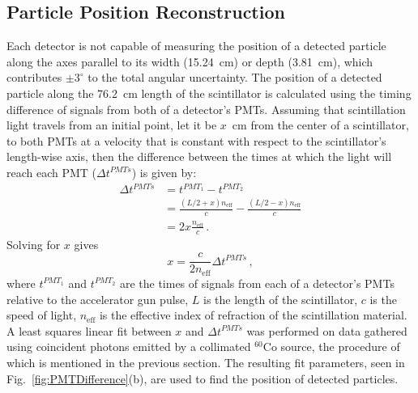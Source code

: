 \subsection{Particle Position Reconstruction}
Each detector is not capable of measuring the position of a detected particle along the axes parallel to its width (15.24~cm) or depth (3.81~cm), which contributes $\pm3^{\circ}$ to the total angular uncertainty.
The position of a detected particle along the 76.2~cm length of the scintillator is calculated using the timing difference of signals from both of a detector's PMTs.
Assuming that scintillation light travels from an initial point, let it be $x$~cm from the center of a scintillator, to both PMTs at a velocity that is constant with respect to the scintillator's length-wise axis, then the difference between the times at which the light will reach each PMT ($\Delta t^{PMTs}$) is given by:
\begin{equation}
\begin{split}
\Delta t^{PMTs} & = t^{PMT_1}-t^{PMT_2} \\ 
& = \frac{(L/2 + x) n_{\text{eff}}}{c} - \frac{(L/2-x) n_{\text{eff}}}{c} \\
& = 2x \frac{n_{\text{eff}}}{c}  \, .
\end{split}
\end{equation}
Solving for $x$ gives 
\begin{equation}
\label{eq:position}
x = \frac{c}{2n_{\text{eff}}} \Delta t^{PMTs} \, ,
\end{equation}
where $t^{PMT_{1}}$ and $t^{PMT_{2}}$ are the times of signals from each of a detector's PMTs relative to the accelerator gun pulse, $L$ is the length of the scintillator, $c$ is the speed of light, $n_{\text{eff}}$ is the effective index of refraction of the scintillation material.
A least squares linear fit between $x$ and $\Delta t^{PMTs}$ was performed on data gathered using coincident photons emitted by a collimated $^{60}$Co source, the procedure of which is mentioned in the previous section.
The resulting fit parameters, seen in Fig.~\ref{fig:PMTDifference}(b), are used to find the position of detected particles.
